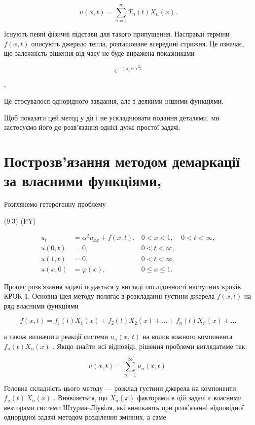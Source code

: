 \documentclass[
  ukrainian,
]{article}
\begin{document}
\[
u(x, t) = \sum_{n=1}^{\infty} T_n(t) X_n(x).
\]

Існують певні фізичні підстави для такого припущення. Насправді терміни
\(f(x,t)\) описують джерело тепла, розташоване всередині стрижня. Це
означає, що залежність рішення від часу не буде виражена показниками

\[
e^{-(\lambda_n\alpha)^2 t}
\]

,

Це стосувалося однорідного завдання, але з деякими іншими функціями.

Щоб показати цей метод у дії і не ускладнювати подання деталями, ми
застосуємо його до розв'язання однієї дуже простої задачі.

\section{Построзв'язання методом демаркації за власними
функціями,}\label{ux43fux43eux441ux442ux440ux43eux437ux432ux44fux437ux430ux43dux43dux44f-ux43cux435ux442ux43eux434ux43eux43c-ux434ux435ux43cux430ux440ux43aux430ux446ux456ux457-ux437ux430-ux432ux43bux430ux441ux43dux438ux43cux438-ux444ux443ux43dux43aux446ux456ux44fux43cux438}

Розглянемо гетерогенну проблему

(9.3) (PY)

\[
\begin{aligned} u_t &= \alpha^2 u_{xx} + f(x, t), & 0 < x < 1, & 0 < t < \infty, \\ u(0, t) &= 0, & 0 < t < \infty, \\ u(1, t) &= 0, & 0 < t < \infty, \\ u(x, 0) &= \varphi(x), & 0 \leqslant x \leqslant 1. \end{aligned}
\]

Процес розв'язання задачі подається у вигляді послідовності наступних
кроків. КРОК 1. Основна ідея методу полягає в розкладанні густини
джерела \(f(x, t)\) на ряд власними функціями

\[
f(x, t) = f_1(t) X_1(x) + f_2(t) X_2(x) + \dots + f_n(t) X_n(x) + \dots
\]

а також визначити реакції системи \(u_n\left(x,\,t\right)\) на вплив
кожного компонента \(f_n\left(t\right)X_n\left(x\right)\) . Якщо знайти
всі відповіді, рішення проблеми виглядатиме так:

\[
u(x, t) = \sum_{n=1}^{\infty} u_n(x, t).
\]

Головна складність цього методу --- розклад густини джерела на
компоненти \(f_n(t)\,X_n(x)\) . Виявляється, що \(X_n(x)\) факторами в
цій задачі є власними векторами системи Штурма--Ліувіля, які виникають
при розв'язанні відповідної однорідної задачі методом розділення
змінних, а саме
\end{document}
